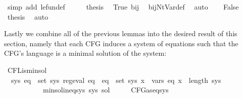 \begin{isabellebody}
\ {\isacharparenleft}{\kern0pt}simp\ add{\isacharcolon}{\kern0pt}\ le{\isacharunderscore}{\kern0pt}fun{\isacharunderscore}{\kern0pt}def{\isacharparenright}{\kern0pt}\isanewline
\ \ \isamarkupfalse%
\ \isamarkupfalse%
\ {\isacharquery}{\kern0pt}thesis\ \isamarkupfalse%
\ True\ bij{\isacharunderscore}{\kern0pt}{\isasymgamma}{\isacharunderscore}{\kern0pt}{\isasymgamma}{\isacharprime}{\kern0pt}\ \isamarkupfalse%
\ bij{\isacharunderscore}{\kern0pt}Nt{\isacharunderscore}{\kern0pt}Var{\isacharunderscore}{\kern0pt}def\ \isamarkupfalse%
\ auto\isanewline
{}\isamarkupfalse%
\isanewline
\ \ \isamarkupfalse%
\ False\isanewline
\ \ \isamarkupfalse%
\ \isamarkupfalse%
\ {\isacharquery}{\kern0pt}thesis\ \isamarkupfalse%
\ auto\isanewline
{}\isamarkupfalse%
%
\endisatagproof
{\isafoldproof}%
%
\isadelimproof
%
\endisadelimproof
%
\begin{isamarkuptext}%
Lastly we combine all of the previous lemmas into the desired result of this section, namely
that each CFG induces a system of  equations such that the CFG's language is a
minimal solution of the system:%
\end{isamarkuptext}\isamarkuptrue%
\isamarkupfalse%
\ CFL{\isacharunderscore}{\kern0pt}is{\isacharunderscore}{\kern0pt}min{\isacharunderscore}{\kern0pt}sol{\isacharcolon}{\kern0pt}\isanewline
\ \ {\isachardoublequoteopen}{\isasymexists}sys{\isachardot}{\kern0pt}\ {\isacharparenleft}{\kern0pt}{\isasymforall}eq\ {\isasymin}\ set\ sys{\isachardot}{\kern0pt}\ reg{\isacharunderscore}{\kern0pt}eval\ eq{\isacharparenright}{\kern0pt}\ {\isasymand}\ {\isacharparenleft}{\kern0pt}{\isasymforall}eq\ {\isasymin}\ set\ sys{\isachardot}{\kern0pt}\ {\isasymforall}x\ {\isasymin}\ vars\ eq{\isachardot}{\kern0pt}\ x\ {\isacharless}{\kern0pt}\ length\ sys{\isacharparenright}{\kern0pt}\isanewline
\ \ \ \ \ \ \ \ \ \ {\isasymand}\ min{\isacharunderscore}{\kern0pt}sol{\isacharunderscore}{\kern0pt}ineq{\isacharunderscore}{\kern0pt}sys\ sys\ sol{\isachardoublequoteclose}\isanewline
%
\isadelimproof
%
\endisadelimproof
%
\isatagproof
{}\isamarkupfalse%
\ {\isacharminus}{\kern0pt}\isanewline
\ \ \isamarkupfalse%
\ CFG{\isacharunderscore}{\kern0pt}as{\isacharunderscore}{\kern0pt}eq{\isacharunderscore}{\kern0pt}sys\ \isamarkupfalse%

\end{isabellebody}
